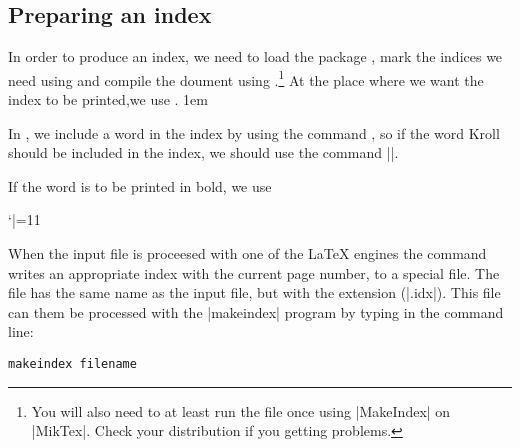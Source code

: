 \stoptemplate

\pagestyle{headings}


\setlength{\columnsep}{2em}

\begin{multicols}{2}

\section{Preparing an index}


In order to produce an index, we need to load the
package , mark the indices we need using   and compile the doument using  .\footnote{You will also need to at least run the file once using |MakeIndex| on |MikTex|. Check your distribution if you getting problems.}
At the place where we want the index to be printed,we use .
\parindent1em

In \latex, we include a word
in the index by using the command \cmd{\index}, so if the word Kroll should be included in
the index, we should use the command ||.

If the word is to be printed in bold, we use

\bgroup
 \catcode`|=11
\gdef\idxmain#1{%
   \def\idxmainentryi##1##2##3;{%
      \index{Kroll=\textbf{#1}|textbf}
    }
   \idxmainentryi#1;    
}  
\egroup

\idxmain{Kroll}




When the input file is proceesed with one of the LaTeX engines the  command
writes an appropriate index with the current page number, to a special file. The file has the same
name as the \latex input file, but with the extension (|.idx|). This file can them be processed with the |makeindex|
program by typing in the command line:

\begin{verbatim}
makeindex filename
\end{verbatim}


\end{multicols}
